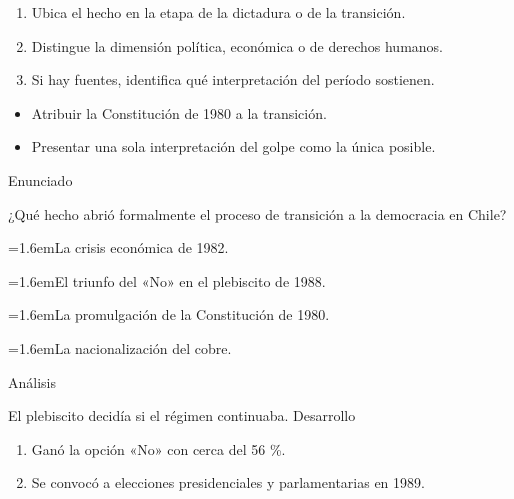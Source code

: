 \documentclass[10pt,a4paper,twocolumn]{article}
\newcommand{\alternativa}[2]{\par\noindent\hangindent=1.6em\hangafter=1\makebox[1.6em][l]{\tecla{#1}}#2\par}
\newcommand{\clave}[1]{\par\smallskip{\sffamily\footnotesize\color{esmeralda} Clave \teclaok{#1}}\par}
\begin{document}
\begin{metodo}
\begin{enumerate}
  \item Ubica el hecho en la etapa de la dictadura o de la transición.
  \item Distingue la dimensión política, económica o de derechos humanos.
  \item Si hay fuentes, identifica qué interpretación del período sostienen.
\end{enumerate}
\end{metodo}

\begin{errorfrecuente}
\begin{itemize}
  \item Atribuir la Constitución de 1980 a la transición.
  \item Presentar una sola interpretación del golpe como la única posible.
\end{itemize}
\end{errorfrecuente}

\begin{ejemplo}
{\sffamily\footnotesize\color{zinc500} Enunciado}\par
¿Qué hecho abrió formalmente el proceso de transición a la democracia en Chile?
\alternativa{A}{La crisis económica de 1982.}
\alternativa{B}{El triunfo del «No» en el plebiscito de 1988.}
\alternativa{C}{La promulgación de la Constitución de 1980.}
\alternativa{D}{La nacionalización del cobre.}
\clave{B}
{\sffamily\footnotesize\color{zinc500} Análisis}\par El plebiscito decidía si el régimen continuaba.
{\sffamily\footnotesize\color{zinc500} Desarrollo}
\begin{enumerate}
  \item Ganó la opción «No» con cerca del 56 \%.
  \item Se convocó a elecciones presidenciales y parlamentarias en 1989.
\end{enumerate}
\end{ejemplo}
\end{document}
